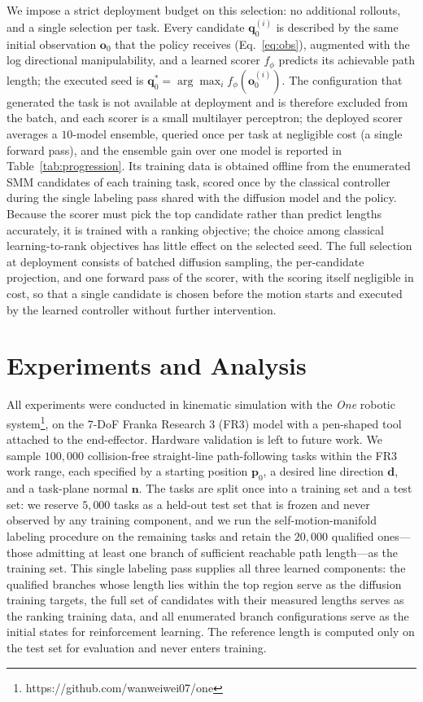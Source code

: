 \documentclass[journal, twoside]{IEEEtran}
\begin{document}
We impose a strict deployment budget on this selection: no additional rollouts, and a single selection per task. Every candidate $\mathbf{q}_{0}^{(i)}$ is described by the same initial observation $\mathbf{o}_{0}$ that the policy receives (Eq.~\eqref{eq:obs}), augmented with the log directional manipulability, and a learned scorer $f_{\phi}$ predicts its achievable path length; the executed seed is $\mathbf{q}_{0}^{*}=\arg\max_{i} f_{\phi}(\mathbf{o}_{0}^{(i)})$. The configuration that generated the task is not available at deployment and is therefore excluded from the batch, and each scorer is a small multilayer perceptron; the deployed scorer averages a $10$-model ensemble, queried once per task at negligible cost (a single forward pass), and the ensemble gain over one model is reported in Table~\ref{tab:progression}. Its training data is obtained offline from the enumerated SMM candidates of each training task, scored once by the classical controller during the single labeling pass shared with the diffusion model and the policy. Because the scorer must pick the top candidate rather than predict lengths accurately, it is trained with a ranking objective; the choice among classical learning-to-rank objectives has little effect on the selected seed. The full selection at deployment consists of batched diffusion sampling, the per-candidate projection, and one forward pass of the scorer, with the scoring itself negligible in cost, so that a single candidate is chosen before the motion starts and executed by the learned controller without further intervention.



\section{Experiments and Analysis}
\label{sec:exp}
All experiments were conducted in kinematic simulation with the \textit{One} robotic system\footnote{https://github.com/wanweiwei07/one}, on the 7-DoF Franka Research 3 (FR3) model with a pen-shaped tool attached to the end-effector. Hardware validation is left to future work. We sample $100{,}000$ collision-free straight-line path-following tasks within the FR3 work range, each specified by a starting position $\mathbf{p}_0$, a desired line direction $\mathbf{d}$, and a task-plane normal $\mathbf{n}$. The tasks are split once into a training set and a test set: we reserve $5{,}000$ tasks as a held-out test set that is frozen and never observed by any training component, and we run the self-motion-manifold labeling procedure on the remaining tasks and retain the $20{,}000$ qualified ones---those admitting at least one branch of sufficient reachable path length---as the training set. This single labeling pass supplies all three learned components: the qualified branches whose length lies within the top region serve as the diffusion training targets, the full set of candidates with their measured lengths serves as the ranking training data, and all enumerated branch configurations serve as the initial states for reinforcement learning. The reference length is computed only on the test set for evaluation and never enters training.
\end{document}
